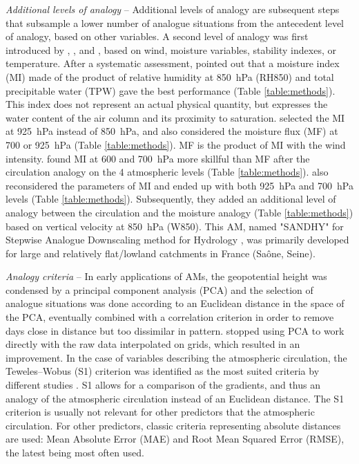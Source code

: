 \documentclass[review]{elsarticle}
\begin{document}
\textit{Additional levels of analogy} -- Additional levels of analogy are subsequent steps that subsample a lower number of analogue situations from the antecedent level of analogy, based on other variables. A second level of analogy was first introduced by \citet{Mandon1985}, \citet{Vallee1986}, and \citet{Gibergans-Baguena2007}, based on wind, moisture variables, stability indexes, or temperature. After a systematic assessment, \citet{Bontron2004} pointed out that a moisture index (MI) made of the product of relative humidity at 850~hPa (RH850) and total precipitable water (TPW) gave the best performance (Table \ref{table:methods}). This index does not represent an actual physical quantity, but expresses the water content of the air column and its proximity to saturation. \citet{Marty2010} selected the MI at 925~hPa instead of 850~hPa, and also considered the moisture flux (MF) at 700 or 925~hPa (Table \ref{table:methods}). MF is the product of MI with the wind intensity. \citet{Horton2018a} found MI at 600 and 700~hPa more skillful than MF after the circulation analogy on the 4 atmospheric levels (Table \ref{table:methods}). \citet{BenDaoud2016} also reconsidered the parameters of MI and ended up with both 925~hPa and 700~hPa levels (Table \ref{table:methods}). Subsequently, they added an additional level of analogy between the circulation and the moisture analogy (Table \ref{table:methods}) based on vertical velocity at 850~hPa (W850). This AM, named "SANDHY" for Stepwise Analogue Downscaling method for Hydrology \citep{BenDaoud2016, Caillouet2016}, was primarily developed for large and relatively flat/lowland catchments in France (Sa\^{o}ne, Seine).

\textit{Analogy criteria} -- In early applications of AMs, the geopotential height was condensed by a principal component analysis (PCA) and the selection of analogue situations was done according to an Euclidean distance in the space of the PCA, eventually combined with a correlation criterion in order to remove days close in distance but too dissimilar in pattern. \citet{Guilbaud1997} stopped using PCA to work directly with the raw data interpolated on grids, which resulted in an improvement. In the case of variables describing the atmospheric circulation, the Teweles--Wobus (S1) criterion \citep[Eq. (\ref{eq:S1}), ][]{Teweles1954, Drosdowsky2003} was identified as the most suited criteria by different studies \citep{Wilson1980, Woodcock1980, Guilbaud1998, Bontron2004}. S1 allows for a comparison of the gradients, and thus an analogy of the atmospheric circulation instead of an Euclidean distance. The S1 criterion is usually not relevant for other predictors that the atmospheric circulation. For other predictors, classic criteria representing absolute distances are used: Mean Absolute Error (MAE) and Root Mean Squared Error (RMSE), the latest being most often used.
\end{document}
